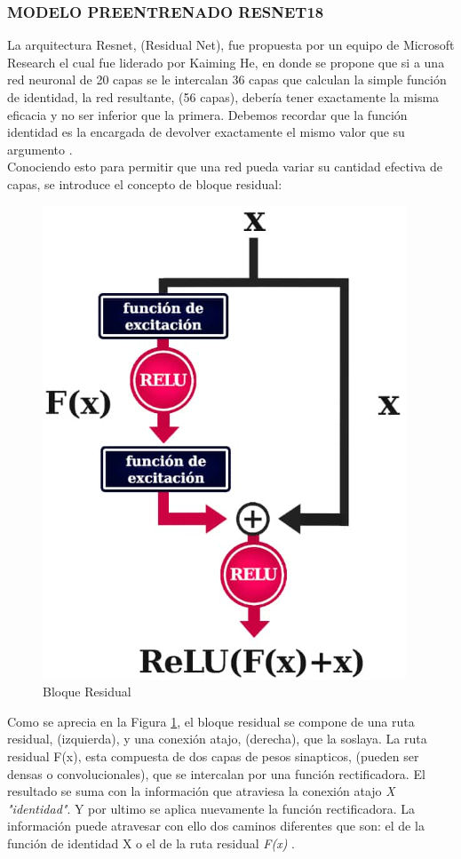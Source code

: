 			\newpage
			\subsubsection{\MakeUppercase{Modelo preentrenado RESNET18}}
				La arquitectura Resnet, (Residual Net), fue propuesta por un equipo de Microsoft Research el cual fue liderado por Kaiming He, en donde se propone que si a una red neuronal de 20 capas se le intercalan 36 capas que calculan la simple función de identidad, la red resultante, (56 capas), debería tener exactamente la misma eficacia y no ser inferior que la primera. Debemos recordar que la función identidad es la encargada de devolver exactamente el mismo valor que su argumento \cite{ref_4}.\\
				
				Conociendo esto para permitir que una red pueda variar su cantidad efectiva de capas, se introduce el concepto de bloque residual:
	
				\begin{figure}[ht]
					\centering
					\includegraphics[scale=0.6]{Figs/67.png}
					\caption{Bloque Residual}
					\label{fig:Bloque}
				\end{figure}
			
				Como se aprecia en la Figura \ref{fig:Bloque}, el bloque residual se compone de una ruta residual, (izquierda), y una conexión atajo, (derecha), que la soslaya. La ruta residual F(x), esta compuesta de dos capas de pesos sinapticos, (pueden ser densas o convolucionales), que se intercalan por una función rectificadora. El resultado se suma con la información que atraviesa la conexión atajo \textit{X "identidad"}. Y por ultimo se aplica nuevamente la función rectificadora. La información puede atravesar con ello dos caminos diferentes que son: el de la función de identidad X o el de la ruta residual \textit{F(x)} \cite{ref_5}.

